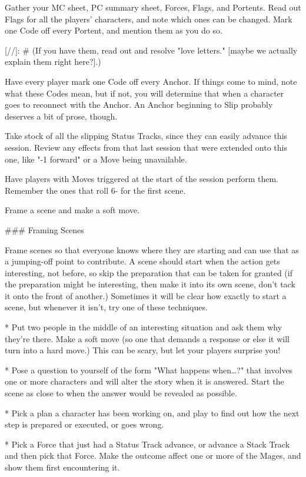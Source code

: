 \documentclass[
  oneside,
  statementpaper,
  9pt]{memoir}
\begin{document}
\begin{MC}

Gather your MC sheet, PC summary sheet, Forces, Flags, and Portents. Read out Flags for all the players’ characters, and note which ones can be changed. Mark one Code off every Portent, and mention them as you do so.

[//]: # (If you have them, read out and resolve "love letters." [maybe we actually explain them right here?].)

Have every player mark one Code off every Anchor. If things come to mind, note what these Codes mean, but if not, you will determine that when a character goes to reconnect with the Anchor. An Anchor beginning to Slip probably deserves a bit of prose, though.

Take stock of all the slipping Status Tracks, since they can easily advance this session. Review any effects from that last session that were extended onto this one, like "-1 forward" or a Move being unavailable.

Have players with Moves triggered at the start of the session perform them. Remember the ones that roll 6- for the first scene.

Frame a scene and make a soft move.

### Framing Scenes

Frame scenes so that everyone knows where they are starting and can use that as a jumping-off point to contribute. A scene should start when the action gets interesting, not before, so skip the preparation that can be taken for granted (if the preparation might be interesting, then make it into its own scene, don’t tack it onto the front of another.) Sometimes it will be clear how exactly to start a scene, but whenever it isn’t, try one of these techniques.

* Put two people in the middle of an interesting situation and ask them why they’re there. Make a soft move (so one that demands a response or else it will turn into a hard move.) This can be scary, but let your players surprise you!

* Pose a question to yourself of the form "What happens when…?" that involves one or more characters and will alter the story when it is answered. Start the scene as close to when the answer would be revealed as possible.

* Pick a plan a character has been working on, and play to find out how the next step is prepared or executed, or goes wrong.

* Pick a Force that just had a Status Track advance, or advance a Stack Track and then pick that Force. Make the outcome affect one or more of the Mages, and show them first encountering it.


\end{MC}
\end{document}
